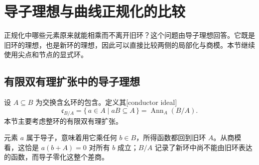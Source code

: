 
\section{导子理想与曲线正规化的比较}\label{b3:sec:0606}

正规化中哪些元素原来就能相乘而不离开旧环？这个问题由导子理想回答。它既是旧环的理想，也是新环的理想，因此可以直接比较两侧的局部化与商模。本节继续使用尖点和节点的显式环。

\subsection{有限双有理扩张中的导子理想}\label{b3:subsec:0606:01}

\begin{definition}\label{b3:def:conductor}
	设 \(A\subseteq B\) 为交换含幺环的包含。定义其[conductor ideal]
	\[
		\mathfrak c_{B/A} =\{\,a\in A\mid aB\subseteq A\,\} =\operatorname{Ann}_A(B/A).
	\]
	本节主要考虑整环的有限双有理扩张。
\end{definition}

元素 \(a\) 属于导子，意味着用它乘任何 \(b\in B\)，所得函数都回到旧环 \(A\)。从商模看，这恰是 \(a(b+A)=0\) 对所有 \(b\) 成立；\(B/A\) 记录了新环中尚不能由旧环表达的函数，而导子零化这整个差商。

